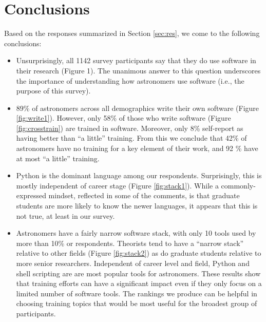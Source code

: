 
\section{Conclusions}
\label{sec:conc}


Based on the responses summarized in Section \ref{sec:res}, we come to the following conclusions:



\begin{itemize}
\item Unsurprisingly, all 1142 survey participants say that they do use software in their research (Figure 1). The unanimous answer to this question underscores the importance of understanding how astronomers use software (i.e., the purpose of this survey).
\item $89\%$ of astronomers across all demographics write their own software (Figure \ref{fig:write1}).  However, only 58\% of those who write software (Figure \ref{fig:crosstrain}) are trained in software.  Moreover, only 8\% self-report as having better than ``a little'' training.  From this we conclude that 42\% of astronomers have no training for a key element of their work, and 92 \% have at most ``a little'' training.  
\item Python is the dominant language among our respondents.  Surprisingly, this is mostly independent of career stage (Figure \ref{fig:stack1}).  While a commonly-expressed mindset, reflected in some of the comments, is that graduate students are more likely to know the newer languages, it appears that this is not true, at least in our survey. 
\item Astronomers have a fairly narrow software stack, with only 10 tools used by more than 10\% or respondents. Theorists tend to have a ``narrow stack'' relative to other fields (Figure \ref{fig:stack2}) as do graduate students relative to more senior researchers. Independent of career level and field, Python and shell scripting are are most popular tools for astronomers. These results show that training efforts can have a significant impact even if they only focus on a limited number of software tools. The rankings we produce can be helpful in choosing training topics that would be most useful for the broadest group of participants. 
\end{itemize}

